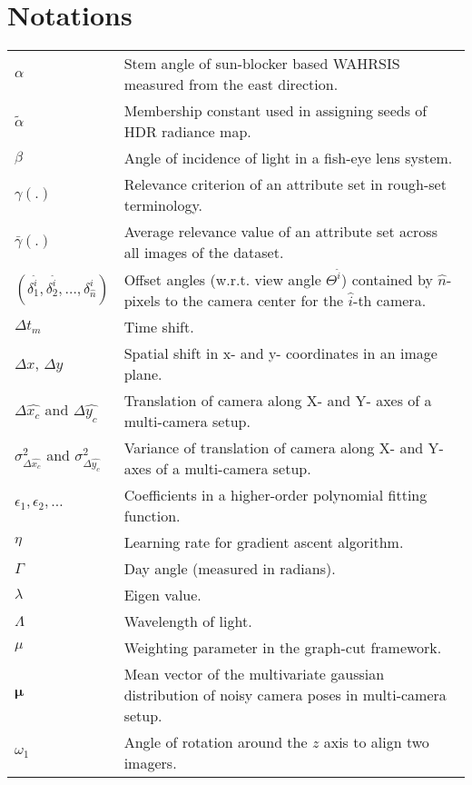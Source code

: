 \chapter*{\centering Notations}


\begin{longtable}[l]{p{80pt}p{320pt}}

$\alpha$ & Stem angle of sun-blocker based WAHRSIS measured from the east direction. \\
$\tilde{\alpha}$ & Membership constant used in assigning seeds of HDR radiance map. \\
$\beta$ & Angle of incidence of light in a fish-eye lens system. \\
$\gamma(.)$ & Relevance criterion of an attribute set in rough-set terminology.\\
$\bar{\gamma}(.)$ & Average relevance value of an attribute set across all images of the dataset.\\
$(\delta_1^{\hat{i}},\delta_2^{\hat{i}},\ldots,\delta_{\hat{n}}^{\hat{i}})$ & Offset angles (w.r.t. view angle $\Theta^{\hat{i}}$) contained by $\hat{n}$-pixels to the camera center for the $\hat{i}$-th camera.\\
$\Delta t_m$ & Time shift.\\
$\Delta x$, $\Delta y$ & Spatial shift in x- and y- coordinates in an image plane.\\
$\Delta \hat{x_c}$ and $\Delta \hat{y_c}$ & Translation of camera along X- and Y- axes of a multi-camera setup.\\
$\sigma_{\Delta \hat{x_c}}^2$ and $\sigma_{\Delta \hat{y_c}}^2$ & Variance of translation of camera along X- and Y- axes of a multi-camera setup.\\
$\epsilon_1, \epsilon_2,\ldots$ & Coefficients in a higher-order polynomial fitting function. \\
$\eta$ & Learning rate for gradient ascent algorithm. \\
$\Gamma$ & Day angle (measured in radians).\\
$\lambda$ & Eigen value. \\
$\Lambda$ & Wavelength of light. \\
$\mu$ & Weighting parameter in the graph-cut framework. \\
$\boldsymbol{\mu}$ & Mean vector of the multivariate gaussian distribution of noisy camera poses in multi-camera setup. \\
$\omega_1$ & Angle of rotation around the $z$ axis to align two imagers.\\

\end{longtable}
